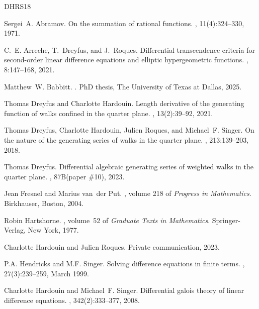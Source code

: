\documentclass[preprint,12pt]{elsarticle}
\numberwithin{equation}{section} %
\theoremstyle{theorem}
\theoremstyle{definition}
\begin{document}
\begin{thebibliography}{DHRS18}

Sergei~A. Abramov.
\newblock On the summation of rational functions.
, 11(4):324--330, 1971.

C.~E. Arreche, T.~Dreyfus, and J.~Roques.
\newblock Differential transcendence criteria for second-order linear difference equations and elliptic hypergeometric functions.
, 8:147--168, 2021.

Matthew~W. Babbitt.
.
\newblock PhD thesis, The University of Texas at Dallas, 2025.

Thomas Dreyfus and Charlotte Hardouin.
\newblock Length derivative of the generating function of walks confined in the quarter plane.
, 13(2):39--92, 2021.

Thomas Dreyfus, Charlotte Hardouin, Julien Roques, and Michael~F. Singer.
\newblock On the nature of the generating series of walks in the quarter plane.
, 213:139--203, 2018.

Thomas Dreyfus.
\newblock Differential algebraic generating series of weighted walks in the quarter plane.
, 87B(paper \#10), 2023.

Jean Fresnel and Marius van~der Put.
, volume 218 of {\em Progress in {{Mathematics}}}.
\newblock Birkhauser, Boston, 2004.

Robin Hartshorne.
, volume~52 of {\em Graduate Texts in Mathematics}.
\newblock Springer-Verlag, New York, 1977.

Charlotte Hardouin and Julien Roques.
\newblock Private communication, 2023.

P.A. Hendricks and M.F. Singer.
\newblock Solving difference equations in finite terms.
, 27(3):239–259, March 1999.

Charlotte Hardouin and Michael~F. Singer.
\newblock Differential galois theory of linear difference equations.
, 342(2):333--377, 2008.


\end{thebibliography}
\end{document}
